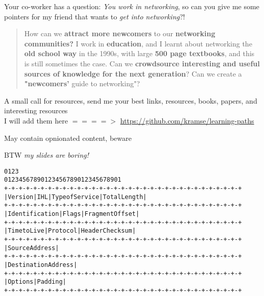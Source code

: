 \documentclass[Screen16to9,17pt]{foils}
\begin{document}
{}





{\Large Your co-worker has a question: \emph{You work in networking}, so can you give me some pointers for my friend that wants to \emph{get into networking}?!}

\begin{quote}
How can we {\bf attract more newcomers} to our {\bf networking communities?} I work in {\bf education}, and I learnt about networking the {\bf old school way} in the 1990s, with large {\bf 500 page textbooks}, and this is still sometimes the case. Can we {\bf crowdsource interesting and useful sources of knowledge for the next generation}? Can we create a {\bf "newcomers'} guide to networking"?
\end{quote}

\begin{list2}
\item A small call for resources, send me your best links, resources, books, papers, and interesting resources\\
I will add them here $====>$ \url{https://github.com/kramse/learning-paths}
\item May contain opnionated content, beware
\item BTW \emph{my slides are boring!}
\end{list2}



\begin{alltt}\scriptsize
0                   1                   2                   3
0 1 2 3 4 5 6 7 8 9 0 1 2 3 4 5 6 7 8 9 0 1 2 3 4 5 6 7 8 9 0 1
+-+-+-+-+-+-+-+-+-+-+-+-+-+-+-+-+-+-+-+-+-+-+-+-+-+-+-+-+-+-+-+-+
|Version|  IHL  |Type of Service|          Total Length         |
+-+-+-+-+-+-+-+-+-+-+-+-+-+-+-+-+-+-+-+-+-+-+-+-+-+-+-+-+-+-+-+-+
|         Identification        |Flags|      Fragment Offset    |
+-+-+-+-+-+-+-+-+-+-+-+-+-+-+-+-+-+-+-+-+-+-+-+-+-+-+-+-+-+-+-+-+
|  Time to Live |    Protocol   |         Header Checksum       |
+-+-+-+-+-+-+-+-+-+-+-+-+-+-+-+-+-+-+-+-+-+-+-+-+-+-+-+-+-+-+-+-+
|                       Source Address                          |
+-+-+-+-+-+-+-+-+-+-+-+-+-+-+-+-+-+-+-+-+-+-+-+-+-+-+-+-+-+-+-+-+
|                    Destination Address                        |
+-+-+-+-+-+-+-+-+-+-+-+-+-+-+-+-+-+-+-+-+-+-+-+-+-+-+-+-+-+-+-+-+
|                    Options                    |    Padding    |
+-+-+-+-+-+-+-+-+-+-+-+-+-+-+-+-+-+-+-+-+-+-+-+-+-+-+-+-+-+-+-+-+
\end{alltt}
\end{document}
